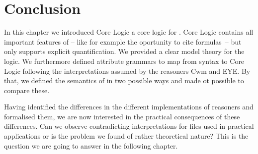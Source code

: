 \section{Conclusion}

In this chapter we introduced \nthree Core Logic a core logic for \nthree.  \nthree Core Logic contains all important features of 
\nthree{} -- like for example the oportunity to cite formulas~-- but only supports explicit quantification. 
We provided a clear model theory for the logic.
We furthermore defined attribute grammars 
to map from \nthree syntax to \nthree Core Logic following the interpretations assumed by the reasoners Cwm and EYE. 
By that, we defined the semantics of \nthree in two possible ways and made ot possible to compare these.

Having identified the differences in the different implementations of \nthree reasoners and formalised them, we are now interested in the practical consequences of these 
differences. Can we observe contradicting interpretations for files used in practical applications or is the problem we found of rather theoretical 
nature? This is the question we are going to answer in the following chapter.

